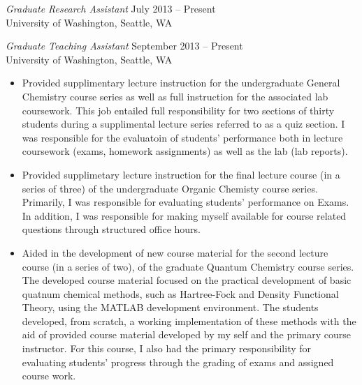 \documentclass[10pt]{res} %
\begin{document}
\begin{resume}
\vspace{8pt} %

{\sl Graduate Research Assistant} \hfill July 2013 -- Present \\
University of Washington, Seattle, WA

{\sl Graduate Teaching Assistant} \hfill September 2013 -- Present \\
University of Washington, Seattle, WA 
\begin{itemize} \itemsep -2pt
  \item Provided supplimentary lecture instruction for the undergraduate General Chemistry course series
    as well as full instruction for the associated lab coursework. This job entailed full responsibility
    for two sections of thirty students during a supplimental lecture series referred to as a quiz section.
    I was responsible for the evaluatoin of students' performance both in lecture coursework (exams, homework assignments)
    as well as the lab (lab reports).
  \item Provided supplimetary lecture instruction for the final lecture course (in a series of three) of
    the undergraduate Organic Chemisty course series. Primarily, I was responsible for evaluating students' performance on
    Exams. In addition, I was responsible for making myself available for course related questions through
    structured office hours.
  \item Aided in the development of new course material for the second lecture course (in a series of two),
    of the graduate Quantum Chemistry course series. The developed course material focused on the practical
    development of basic quatnum chemical methods, such as Hartree-Fock and Density Functional Theory, using
    the MATLAB development environment. The students developed, from scratch, a working implementation
    of these methods with the aid of provided course material developed by my self and the primary course
    instructor. For this course, I also had the primary responsibility for evaluating students' progress
    through the grading of exams and assigned course work.
\end{itemize}


\end{resume}
\end{document}
